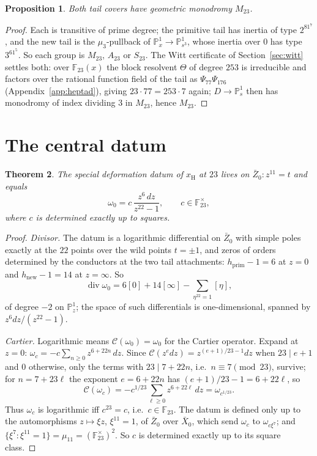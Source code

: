 \documentclass[11pt]{amsart}
\newcommand{\FF}{\mathbb{F}}
\newcommand{\PP}{\mathbb{P}}
\newcommand{\Mtw}{M_{23}}
\newcommand{\xH}{x_{\mathrm H}}
\theoremstyle{plain}
\newtheorem{theorem}{Theorem}[section]
\newtheorem{proposition}[theorem]{Proposition}
\theoremstyle{definition}
\begin{document}
\begin{proposition}\label{prop:tailmon}
Both tail covers have geometric monodromy $\Mtw$.
\end{proposition}
\begin{proof}
Each is transitive of prime degree; the primitive tail has inertia
of type $2^81^7$, and the new tail is the $\mu_3$-pullback of
$\PP^1_x\to\PP^1_{s^3}$, whose inertia over $0$ has type $3^61^5$. So
each group is $\Mtw$, $A_{23}$ or $S_{23}$. The Witt certificate of
Section~\ref{sec:witt} settles both: over $\FF_{23}(x)$ the block
resolvent $\Theta$ of degree $253$ is irreducible and factors over the
rational function field of the tail as $\Psi_{77}\Psi_{176}$
(Appendix~\ref{app:heptad}), giving $23\cdot77=253\cdot7$ again;
$D\to\PP^1_s$ then has monodromy of index dividing $3$ in $\Mtw$,
hence $\Mtw$.
\end{proof}

\section{The central datum}\label{sec:datum}

\begin{theorem}\label{thm:datum}
The special deformation datum of $\xH$ at $23$ lives on
$\bar Z_0\colon z^{11}=t$ and equals
\[
  \omega_0=c\,\frac{z^6\,dz}{z^{22}-1},\qquad c\in\FF_{23}^\times,
\]
where $c$ is determined exactly up to squares.
\end{theorem}
\begin{proof}
\emph{Divisor.} The datum is a logarithmic differential on $\bar Z_0$
with simple poles exactly at the $22$ points over the wild points
$t=\pm1$, and zeros of orders determined by the conductors at the two
tail attachments: $h_{\mathrm{prim}}-1=6$ at $z=0$ and
$h_{\mathrm{new}}-1=14$ at $z=\infty$. So
\[
  \operatorname{div}\omega_0=6[0]+14[\infty]-\sum_{\eta^{22}=1}[\eta],
\]
of degree $-2$ on $\PP^1_z$; the space of such differentials is
one-dimensional, spanned by $z^6dz/(z^{22}-1)$.

\emph{Cartier.} Logarithmic means $\mathcal C(\omega_0)=\omega_0$ for
the Cartier operator. Expand at $z=0$:
$\omega_c=-c\sum_{n\ge0}z^{6+22n}\,dz$. Since
$\mathcal C(z^{e}dz)=z^{(e+1)/23-1}dz$ when $23\mid e+1$ and $0$
otherwise, only the terms with $23\mid 7+22n$, i.e.\ $n\equiv7\pmod{23}$,
survive; for $n=7+23\ell$ the exponent $e=6+22n$ has
$(e+1)/23-1=6+22\ell$, so
\[
  \mathcal C(\omega_c)=-c^{1/23}\sum_{\ell\ge0}z^{6+22\ell}\,dz=\omega_{c^{1/23}} .
\]
Thus $\omega_c$ is logarithmic iff $c^{23}=c$, i.e.\ $c\in\FF_{23}$.
The datum is defined only up to the automorphisms $z\mapsto\xi z$,
$\xi^{11}=1$, of $\bar Z_0$ over $\bar X_0$, which send $\omega_c$ to
$\omega_{c\xi^7}$; and $\{\xi^7:\xi^{11}=1\}=\mu_{11}=(\FF_{23}^\times)^2$.
So $c$ is determined exactly up to its square class.
\end{proof}
\end{document}
